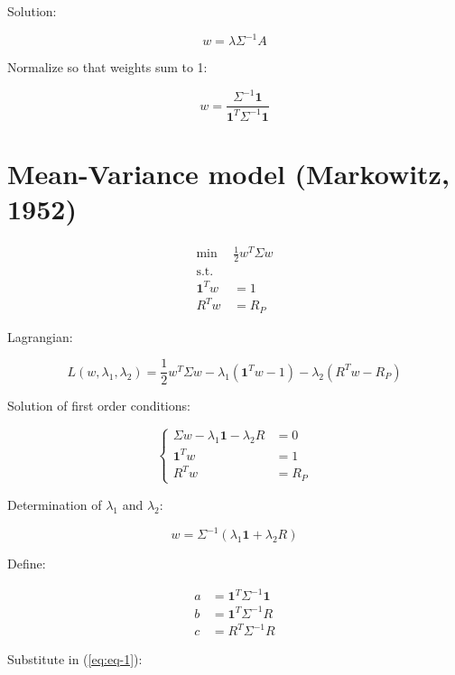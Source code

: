 \documentclass[
  11pt,
]{article}
\begin{document}
Solution:

\[
w = \lambda \Sigma^{-1} A
\]

Normalize so that weights sum to 1:

\[
w = \frac{\Sigma^{-1} \mathbf{1}}{\mathbf{1}^T\Sigma^{-1}\mathbf{1}}
\]

\hypertarget{mean-variance-model-markowitz1952}{%
\section{Mean-Variance model (Markowitz,
1952)}\label{mean-variance-model-markowitz1952}}

\[
\begin{aligned}
    \mbox{min} \ \ & \frac{1}{2} w^T \Sigma w  \\
    \mbox{s.t.} & \\
    \mathbf{1}^Tw & = 1 \\
        R^Tw & = R_P
  \end{aligned}
\]

Lagrangian:

\[
L(w, \lambda_1, \lambda_2) = \frac{1}{2} w^T \Sigma w - \lambda_1(\mathbf{1}^Tw-1) -\lambda_2(R^Tw - R_P)
\]

Solution of first order conditions:

\begin{equation}
\left\{
                \begin{aligned}
                \Sigma w - \lambda_1 \mathbf{1} -\lambda_2 R  &= 0 \label{eq:eq-1} \\
                \mathbf{1}^T w &= 1 \\
                R^Tw & = R_P
                \end{aligned}
              \right.
\end{equation}

Determination of \(\lambda_1\) and \(\lambda_2\):

\[
w = \Sigma^{-1} (\lambda_1 \mathbf{1} + \lambda_2 R)
\]

Define:

\begin{align*}
                a & = \mathbf{1}^T\Sigma^{-1} \mathbf{1}\\
                b & = \mathbf{1}^T\Sigma^{-1} R \\
                c & = R^T \Sigma^{-1} R 
                \end{align*}

Substitute in (\ref{eq:eq-1}):
\end{document}

